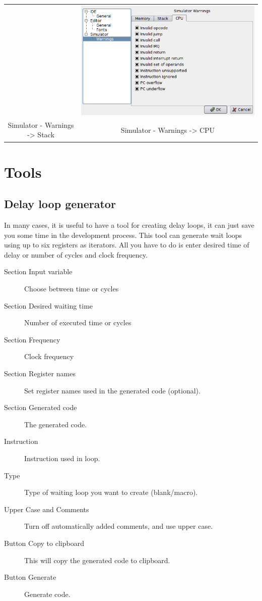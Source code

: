 \begin{table}[h!]
\begin{tabular}{cc}
                    &
                \includegraphics[width=.4\textwidth]{img/interface6.png}
                    \\
                Simulator - Warnings -> Stack & Simulator - Warnings -> CPU
            \end{tabular}
        \end{table}

\clearpage
\section{Tools}
    \subsection{Delay loop generator}
        In many cases, it is useful to have a tool for creating delay loops, it can just save you some time in the
        development process. This tool can generate wait loops using up to six registers as iterators. All you have to do is
        enter desired time of delay or number of cycles and clock frequency.

        \begin{description}
            \item[Section Input variable] Choose between time or cycles
            \item[Section Desired waiting time] Number of executed time or cycles
            \item[Section Frequency] Clock frequency
            \item[Section Register names] Set register names used in the generated code (optional).
            \item[Section Generated code] The generated code.
            \item[Instruction] Instruction used in loop.
            \item[Type] Type of waiting loop you want to create (blank/macro).
            \item[Upper Case and Comments]  Turn off automatically added comments, and use upper case.
            \item[Button Copy to clipboard] This will copy the generated code to clipboard.
            \item[Button Generate] Generate code.
        \end{description}

